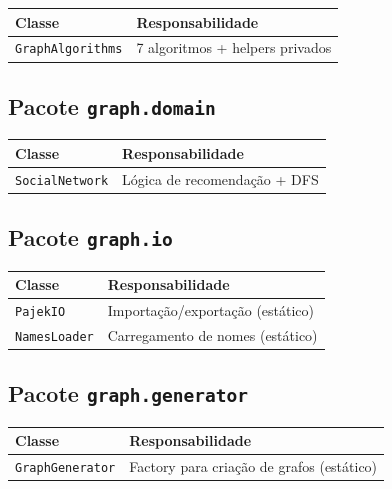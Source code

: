 \documentclass[12pt,a4paper]{article}
\begin{document}
\begin{table}[h]
\centering
\begin{tabular}{|l|l|}
\hline
\textbf{Classe} & \textbf{Responsabilidade} \\
\hline
\texttt{GraphAlgorithms} & 7 algoritmos + helpers privados \\
\hline
\end{tabular}
\end{table}

\subsection{Pacote \texttt{graph.domain}}

\begin{table}[h]
\centering
\begin{tabular}{|l|l|}
\hline
\textbf{Classe} & \textbf{Responsabilidade} \\
\hline
\texttt{SocialNetwork} & Lógica de recomendação + DFS \\
\hline
\end{tabular}
\end{table}

\subsection{Pacote \texttt{graph.io}}

\begin{table}[h]
\centering
\begin{tabular}{|l|l|}
\hline
\textbf{Classe} & \textbf{Responsabilidade} \\
\hline
\texttt{PajekIO} & Importação/exportação (estático) \\
\hline
\texttt{NamesLoader} & Carregamento de nomes (estático) \\
\hline
\end{tabular}
\end{table}

\subsection{Pacote \texttt{graph.generator}}

\begin{table}[h]
\centering
\begin{tabular}{|l|l|}
\hline
\textbf{Classe} & \textbf{Responsabilidade} \\
\hline
\texttt{GraphGenerator} & Factory para criação de grafos (estático) \\
\hline
\end{tabular}
\end{table}
\end{document}
